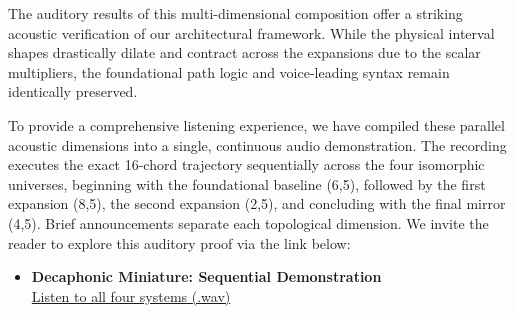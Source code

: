 \documentclass[11pt,letterpaper]{amsart}
\begin{document}
The auditory results of this multi-dimensional composition offer a striking acoustic verification of our architectural framework. While the physical interval shapes drastically dilate and contract across the expansions due to the scalar multipliers, the foundational path logic and voice-leading syntax remain identically preserved. 

To provide a comprehensive listening experience, we have compiled these parallel acoustic dimensions into a single, continuous audio demonstration. The recording executes the exact 16-chord trajectory sequentially across the four isomorphic universes, beginning with the foundational baseline (6,5), followed by the first expansion (8,5), the second expansion (2,5), and concluding with the final mirror (4,5). Brief announcements separate each topological dimension. We invite the reader to explore this auditory proof via the link below:

\vspace{0.3cm}
\begin{itemize}
    \item \textbf{Decaphonic Miniature: Sequential Demonstration}\\
    \href{https://www.fuw.edu.pl/~nurowski/Decaphonic_Jingle_all_systems.wav}{Listen to all four systems (.wav)}
\end{itemize}
\end{document}
